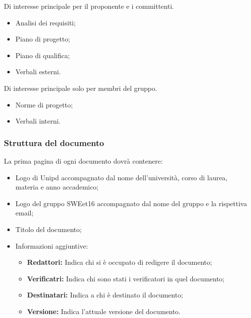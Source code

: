     Di interesse principale per il proponente e i committenti.
    \begin{itemize}
      \item Analisi dei requisiti;
      \item Piano di progetto;
      \item Piano di qualifica;
      \item Verbali esterni.
    \end{itemize}

    Di interesse principale solo per membri del gruppo.
    \begin{itemize}
      \item Norme di progetto;
      \item Verbali interni.
    \end{itemize}


\subsubsection{Struttura del documento}

        La prima pagina di ogni documento dovrà contenere:
        \begin{itemize}
          \item Logo di Unipd accompagnato dal nome dell'università, corso di laurea, materia e anno accademico;
          \item Logo del gruppo SWEet16 accompagnato dal nome del gruppo e la rispettiva email;
          \item Titolo del documento;
          \item Informazioni aggiuntive:
          \begin{itemize}
            \item \textbf{Redattori:} Indica chi si è occupato di redigere il documento;
            \item \textbf{Verificatri:} Indica chi sono stati i verificatori in quel documento;
            \item \textbf{Destinatari:} Indica a chi è destinato il documento;
            \item \textbf{Versione:} Indica l'attuale versione del documento.
          \end{itemize}
        \end{itemize}

        
